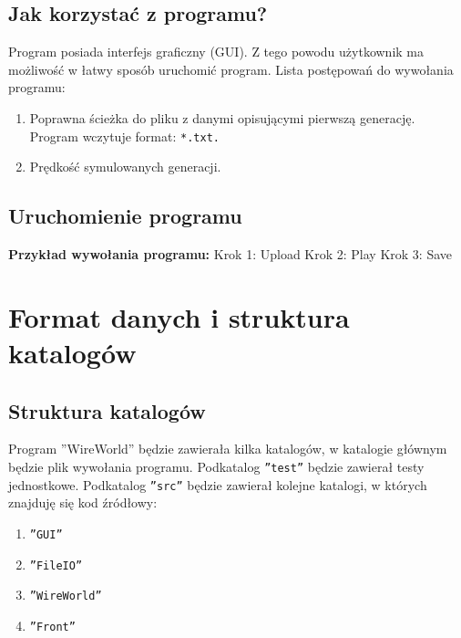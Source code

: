 \documentclass[a4paper, 12pt]{article}
\begin{document}
 		\subsection{Jak korzystać z programu?}
 			\hspace*{1cm} Program posiada interfejs graficzny (GUI). Z tego powodu użytkownik ma możliwość w łatwy sposób uruchomić program.
 			\newline
 			\hspace*{1cm} Lista postępowań do wywołania programu:
 		
 		 	\begin{enumerate}
 			\item Poprawna ścieżka do pliku z danymi opisującymi pierwszą generację. Program wczytuje format: \texttt{*.txt.}
 			\item Prędkość symulowanych generacji.
 			\end{enumerate}
 			
 		\subsection{Uruchomienie programu}
			\hspace*{1cm}\textbf{Przykład wywołania programu:}
			\newline Krok 1: Upload
			\newline Krok 2: Play
			\newline Krok 3: Save
\newpage
	\section{Format danych i struktura katalogów} 

		\subsection{Struktura katalogów}
			\hspace*{1cm} Program ''WireWorld'' będzie zawierała kilka katalogów, w katalogie głównym będzie plik wywołania programu. 
			\newline\hspace*{1cm} Podkatalog \texttt{''test''} będzie zawierał testy jednostkowe.
			\newline\hspace*{1cm} Podkatalog \texttt{''src''} będzie zawierał kolejne katalogi, w których znajduję się kod źródłowy:
			
			\begin{enumerate}
 			\item \texttt{''GUI''}
 			\item \texttt{''FileIO''}
 			\item \texttt{''WireWorld''}
 			\item \texttt{''Front''}
 			\end{enumerate}
 			
\end{document}
